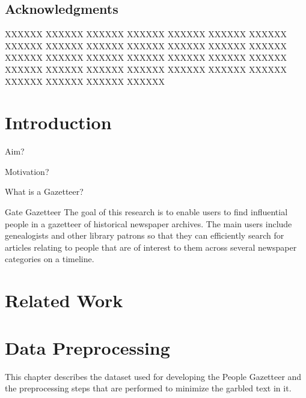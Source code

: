 \documentclass[letterpaper,11pt]{report}
\begin{document}
\newpage
\pagestyle{empty}


\newpage



\section*{Acknowledgments}\label{section:acknowledgments}
\pagestyle{plain}

XXXXXX XXXXXX XXXXXX XXXXXX XXXXXX XXXXXX XXXXXX XXXXXX XXXXXX XXXXXX XXXXXX XXXXXX XXXXXX XXXXXX XXXXXX XXXXXX XXXXXX XXXXXX XXXXXX XXXXXX XXXXXX XXXXXX XXXXXX XXXXXX XXXXXX XXXXXX XXXXXX XXXXXX XXXXXX XXXXXX XXXXXX XXXXXX 

\newpage

\tableofcontents
\listoffigures 
\listoftables

\newpage

\newpage

\newpage
\mbox{}



\chapter{Introduction}\label{chapter:introduction}
\setcounter{page}{1}
\onehalfspacing

Aim?

Motivation? 

What is a Gazetteer?

Gate Gazetteer
The goal of this research is to enable users to find influential people in a gazetteer of historical newspaper archives. The main users  include genealogists and other library patrons so that  they can efficiently search for articles relating to people that are of interest to them across several newspaper categories on a timeline.


\chapter{Related Work}
\chapter{Data Preprocessing}\label{chapter:data preprocessing} 

 
This chapter describes the dataset used for developing the People Gazetteer and the preprocessing steps that are performed to minimize the garbled text in it.
 
\end{document}
